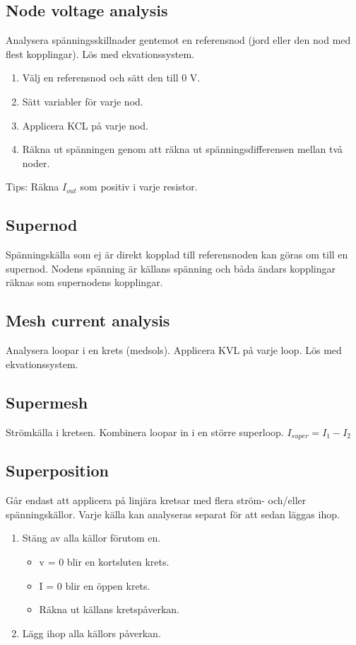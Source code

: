 \subsection*{Node voltage analysis}
Analysera spänningsskillnader gentemot en referensnod (jord eller den nod med flest kopplingar). Lös med ekvationssystem.

\begin{enumerate}
	\item Välj en referensnod och sätt den till 0 V.
	\item Sätt variabler för varje nod.
	\item Applicera KCL på varje nod.
	\item Räkna ut spänningen genom att räkna ut spänningsdifferensen mellan två noder.
\end{enumerate}

Tips: Räkna $ I_{out} $ som positiv i varje resistor. 

\subsection*{Supernod}
Spänningskälla som ej är direkt kopplad till referensnoden kan göras om till en supernod. Nodens spänning är källans spänning och båda ändars kopplingar räknas som supernodens kopplingar.

\subsection*{Mesh current analysis}
Analysera loopar i en krets (medsols). Applicera KVL på varje loop. Lös med ekvationssystem.

\subsection*{Supermesh}
Strömkälla i kretsen. Kombinera loopar in i en större superloop. $ I_{super} = I_1 - I_2 $

\subsection*{Superposition}
Går endast att applicera på linjära kretsar med flera ström- och/eller spänningskällor. Varje källa kan analyseras separat för att sedan läggas ihop.
\begin{enumerate}
	\item Stäng av alla källor förutom en.
	\begin{itemize}
		\item v = 0 blir en kortsluten krets.
		\item I = 0 blir en öppen krets.
		\item Räkna ut källans kretspåverkan.
	\end{itemize}
	\item Lägg ihop alla källors påverkan.
\end{enumerate}